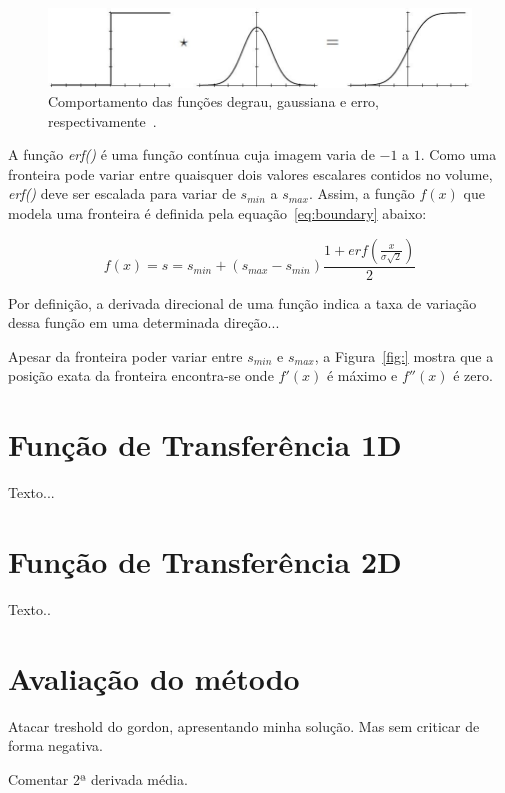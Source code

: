 \begin{figure}[h]
	\centering
	\includegraphics[width=1\textwidth]{images/g_boundary_model}
	\caption{Comportamento das funções degrau, gaussiana e erro, respectivamente~\cite{gordon}.}
	\label{fig:boundary_model}
\end{figure}

	A função \textit{erf()} é uma função contínua cuja imagem varia de $-1$ a $1$. Como uma fronteira pode variar entre quaisquer dois valores escalares contidos no volume, \textit{erf()} deve ser escalada para variar de $s_{min}$ a $s_{max}$. Assim, a função $f(x)$ que modela uma fronteira é definida pela equação~\eqref{eq:boundary} abaixo:

\begin{equation} \label{eq:boundary}
	f(x) = s = s_{min} + (s_{max} - s_{min}) \frac{1 + erf(\frac{x}{\sigma\sqrt{2}})}{2}
\end{equation}
	
	Por definição, a derivada direcional de uma função indica a taxa de variação dessa função em uma determinada direção...
	
	Apesar da fronteira poder variar entre $s_{min}$ e $s_{max}$, a Figura~\ref{fig:} mostra que a posição exata da fronteira encontra-se onde $f'(x)$ é máximo e $f''(x)$ é zero.
    
\section{Função de Transferência 1D}
\label{gordon.1d}
	Texto...
    
\section{Função de Transferência 2D}
\label{gordon.2d}    
    Texto..
    
\section{Avaliação do método}
\label{gordon.aval}    
    Atacar treshold do gordon, apresentando minha solução. Mas sem criticar de forma negativa.
    
    Comentar 2ª derivada média.
    
